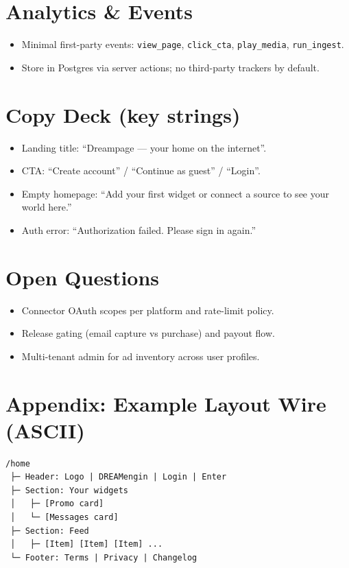 \documentclass[11pt]{article}
\begin{document}
\section{Analytics \& Events}
\begin{itemize}
  \item Minimal first-party events: \texttt{view\_page}, \texttt{click\_cta}, \texttt{play\_media}, \texttt{run\_ingest}.
  \item Store in Postgres via server actions; no third-party trackers by default.
\end{itemize}

\section{Copy Deck (key strings)}
\begin{itemize}
  \item Landing title: ``Dreampage --- your home on the internet''.
  \item CTA: ``Create account'' / ``Continue as guest'' / ``Login''.
  \item Empty homepage: ``Add your first widget or connect a source to see your world here.''
  \item Auth error: ``Authorization failed. Please sign in again.''
\end{itemize}

\section{Open Questions}
\begin{itemize}
  \item Connector OAuth scopes per platform and rate-limit policy.
  \item Release gating (email capture vs purchase) and payout flow.
  \item Multi-tenant admin for ad inventory across user profiles.
\end{itemize}

\section{Appendix: Example Layout Wire (ASCII)}
\begin{verbatim}
/home
 ├─ Header: Logo | DREAMengin | Login | Enter
 ├─ Section: Your widgets
 │   ├─ [Promo card]
 │   └─ [Messages card]
 ├─ Section: Feed
 │   ├─ [Item] [Item] [Item] ...
 └─ Footer: Terms | Privacy | Changelog
\end{verbatim}
\end{document}
